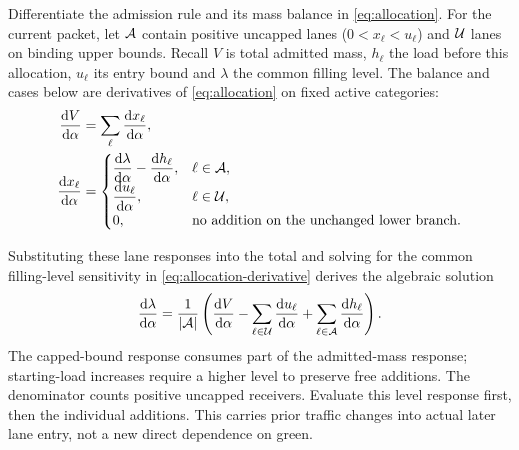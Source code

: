 \documentclass[10pt,a4paper]{article}
\newcommand{\rev}[1]{{\color{revisionred}#1}}
\begin{document}
\par\begin{samepage}
Differentiate the admission rule and its mass balance in
\eqref{eq:allocation}. For the current packet, let ${\cal A}$ contain
positive uncapped lanes ($0<x_\ell<u_\ell$) and ${\cal U}$ lanes on
binding upper bounds. Recall $V$ is total admitted mass, $h_\ell$ the
load before this allocation, $u_\ell$ its entry bound and $\lambda$
the common filling level.
\rev{The balance and cases below are derivatives of \eqref{eq:allocation} on fixed active categories:}
\begin{equation}
 \begin{aligned}
 \frac{\mathrm dV}{\mathrm d\alpha}
 &=\sum_\ell\frac{\mathrm dx_\ell}{\mathrm d\alpha},\\
 \frac{\mathrm dx_\ell}{\mathrm d\alpha}
 &=\begin{cases}
 \displaystyle\frac{\mathrm d\lambda}{\mathrm d\alpha}
             -\frac{\mathrm dh_\ell}{\mathrm d\alpha},&\ell\in{\cal A},\\
 \displaystyle\frac{\mathrm du_\ell}{\mathrm d\alpha},&\ell\in{\cal U},\\
 0,&\text{no addition on the unchanged lower branch}.
 \end{cases}
 \end{aligned}
 \label{eq:allocation-derivative}
\end{equation}
\par\end{samepage}
Substituting these lane responses into the total and solving for the
common filling-level sensitivity \rev{in \eqref{eq:allocation-derivative} derives the algebraic solution}
\begin{equation}
 \frac{\mathrm d\lambda}{\mathrm d\alpha}
 =\frac1{|{\cal A}|}\left(
 \frac{\mathrm dV}{\mathrm d\alpha}
 -\sum_{\ell\in{\cal U}}\frac{\mathrm du_\ell}{\mathrm d\alpha}
 +\sum_{\ell\in{\cal A}}\frac{\mathrm dh_\ell}{\mathrm d\alpha}\right).
 \label{eq:allocation-level-derivative}
\end{equation}
The capped-bound response consumes part of the admitted-mass response;
starting-load increases require a higher level to preserve free additions.
The denominator counts positive uncapped receivers. Evaluate this level
response first, then the individual additions. This carries prior traffic
changes into actual later lane entry, not a new direct dependence on green.
\end{document}
